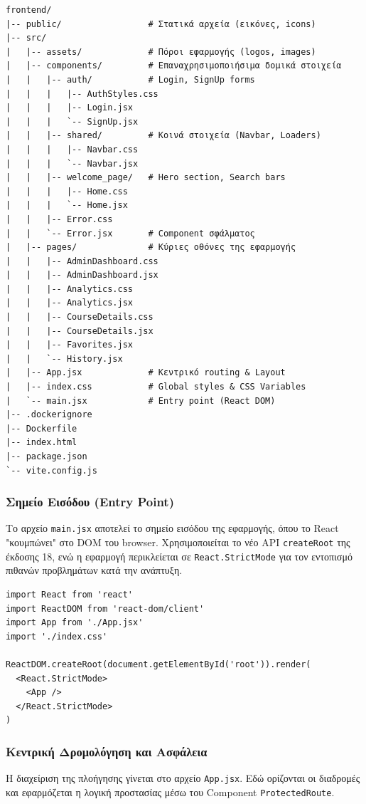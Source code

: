 \documentclass[a4paper,12pt]{article}
\begin{document}
\begin{verbatim}
frontend/
|-- public/                 # Στατικά αρχεία (εικόνες, icons)
|-- src/
|   |-- assets/             # Πόροι εφαρμογής (logos, images)
|   |-- components/         # Επαναχρησιμοποιήσιμα δομικά στοιχεία
|   |   |-- auth/           # Login, SignUp forms
|   |   |   |-- AuthStyles.css
|   |   |   |-- Login.jsx
|   |   |   `-- SignUp.jsx
|   |   |-- shared/         # Κοινά στοιχεία (Navbar, Loaders)
|   |   |   |-- Navbar.css
|   |   |   `-- Navbar.jsx
|   |   |-- welcome_page/   # Hero section, Search bars
|   |   |   |-- Home.css
|   |   |   `-- Home.jsx
|   |   |-- Error.css
|   |   `-- Error.jsx       # Component σφάλματος
|   |-- pages/              # Κύριες οθόνες της εφαρμογής
|   |   |-- AdminDashboard.css
|   |   |-- AdminDashboard.jsx
|   |   |-- Analytics.css
|   |   |-- Analytics.jsx
|   |   |-- CourseDetails.css
|   |   |-- CourseDetails.jsx
|   |   |-- Favorites.jsx
|   |   `-- History.jsx
|   |-- App.jsx             # Κεντρικό routing & Layout
|   |-- index.css           # Global styles & CSS Variables
|   `-- main.jsx            # Entry point (React DOM)
|-- .dockerignore
|-- Dockerfile
|-- index.html
|-- package.json
`-- vite.config.js
\end{verbatim}

\subsubsection{Σημείο Εισόδου (Entry Point)}
Το αρχείο \texttt{main.jsx} αποτελεί το σημείο εισόδου της εφαρμογής, όπου το React "κουμπώνει" στο DOM του browser. Χρησιμοποιείται το νέο API \texttt{createRoot} της έκδοσης 18, ενώ η εφαρμογή περικλείεται σε \texttt{React.StrictMode} για τον εντοπισμό πιθανών προβλημάτων κατά την ανάπτυξη.

\begin{verbatim}
import React from 'react'
import ReactDOM from 'react-dom/client'
import App from './App.jsx'
import './index.css' 

ReactDOM.createRoot(document.getElementById('root')).render(
  <React.StrictMode>
    <App />
  </React.StrictMode>
)
\end{verbatim}

\subsubsection{Κεντρική Δρομολόγηση και Ασφάλεια}
Η διαχείριση της πλοήγησης γίνεται στο αρχείο \texttt{App.jsx}. Εδώ ορίζονται οι διαδρομές και εφαρμόζεται η λογική προστασίας μέσω του Component \texttt{ProtectedRoute}.
\end{document}
